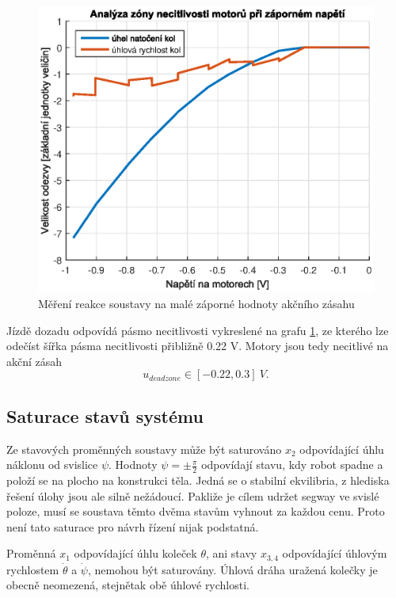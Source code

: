 \documentclass[conference]{IEEEtran}
\begin{document}
\begin{figure}[htbp]
    \centerline{\includegraphics[width=\linewidth]{deadzone_motory_vzad.eps}}
    \caption{Měření reakce soustavy na malé záporné hodnoty akčního zásahu}
    \label{fig:deadzone_vzad}        
\end{figure}

Jízdě dozadu odpovídá pásmo necitlivosti vykreslené na grafu \ref{fig:deadzone_vzad}, ze kterého
lze odečíst šířka pásma necitlivosti přibližně 0.22 \si{V}. Motory jsou tedy necitlivé
na akční zásah
\begin{equation}
    u_{deadzone} \in [-0.22, 0.3] ~\si{V}.
    \label{eq:deadzone}
\end{equation}

\subsection{Saturace stavů systému}

Ze stavových proměnných soustavy může být saturováno $x_2$ odpovídající úhlu náklonu od svislice $\psi$.
Hodnoty $\psi = \pm \frac{\pi}{2}$ odpovídají stavu, kdy robot spadne a položí se na plocho na konstrukci těla.
Jedná se o stabilní ekvilibria, z hlediska řešení úlohy jsou ale silně nežádoucí. Pakliže je cílem udržet segway ve svislé poloze,
musí se soustava těmto dvěma stavům vyhnout za každou cenu. Proto není tato saturace pro návrh řízení nijak podstatná.

Proměnná $x_1$ odpovídající úhlu koleček $\theta$, ani stavy $x_{3,4}$ odpovídající úhlovým rychlostem $\dot{\theta}$ a $\dot{\psi}$,
nemohou být saturovány. Úhlová dráha uražená kolečky je obecně neomezená, stejnětak obě úhlové rychlosti.
\end{document}
